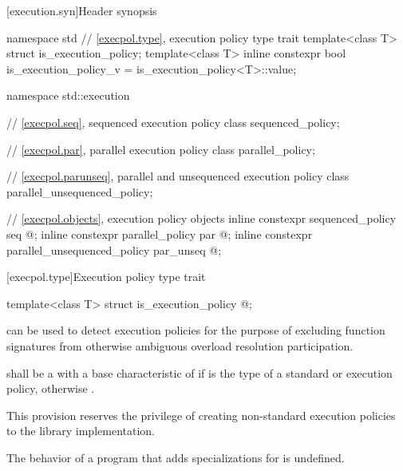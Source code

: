[execution.syn]{Header  synopsis}

%
\begin{codeblock}
namespace std {
  // \ref{execpol.type}, execution policy type trait
  template<class T> struct is_execution_policy;
  template<class T> inline constexpr bool is_execution_policy_v = is_execution_policy<T>::value;
}

namespace std::execution {
  // \ref{execpol.seq}, sequenced execution policy
  class sequenced_policy;

  // \ref{execpol.par}, parallel execution policy
  class parallel_policy;

  // \ref{execpol.parunseq}, parallel and unsequenced execution policy
  class parallel_unsequenced_policy;

  // \ref{execpol.objects}, execution policy objects
  inline constexpr sequenced_policy            seq{ @\unspec@ };
  inline constexpr parallel_policy             par{ @\unspec@ };
  inline constexpr parallel_unsequenced_policy par_unseq{ @\unspec@ };
}
\end{codeblock}

[execpol.type]{Execution policy type trait}

%
\begin{itemdecl}
template<class T> struct is_execution_policy { @\seebelow@ };
\end{itemdecl}

\begin{itemdescr}
\pnum
{} can be used to detect execution policies for the
purpose of excluding function signatures from otherwise ambiguous overload
resolution participation.

\pnum
{} shall be a  with a
base characteristic of  if  is the type of a standard
or 
execution policy, otherwise .

\begin{note}
This provision reserves the privilege of creating non-standard execution
policies to the library implementation.
\end{note}

\pnum
The behavior of a program that adds specializations for
 is undefined.
\end{itemdescr}

